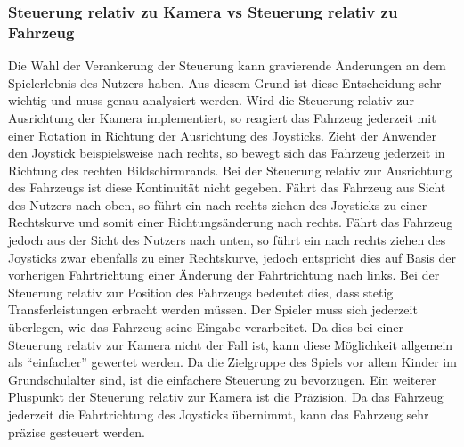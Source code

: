 	\subsubsection{Steuerung relativ zu Kamera vs Steuerung relativ zu Fahrzeug}
    Die Wahl der Verankerung der Steuerung kann gravierende Änderungen an dem Spielerlebnis des Nutzers haben. Aus diesem Grund ist diese Entscheidung sehr wichtig und muss genau analysiert werden.
    Wird die Steuerung relativ zur Ausrichtung der Kamera implementiert, so reagiert das Fahrzeug jederzeit mit einer Rotation in Richtung der Ausrichtung des Joysticks. Zieht der Anwender den Joystick beispielsweise nach rechts, so bewegt sich das Fahrzeug jederzeit in Richtung des rechten Bildschirmrands. Bei der Steuerung relativ zur Ausrichtung des Fahrzeugs ist diese Kontinuität nicht gegeben. Fährt das Fahrzeug aus Sicht des Nutzers nach oben, so führt ein nach rechts ziehen des Joysticks zu einer Rechtskurve und somit einer Richtungsänderung nach rechts.
    Fährt das Fahrzeug jedoch aus der Sicht des Nutzers nach unten, so führt ein nach rechts ziehen des Joysticks zwar ebenfalls zu einer Rechtskurve, jedoch entspricht dies auf Basis der vorherigen Fahrtrichtung einer Änderung der Fahrtrichtung nach links.
    Bei der Steuerung relativ zur Position des Fahrzeugs bedeutet dies, dass stetig Transferleistungen erbracht werden müssen. Der Spieler muss sich jederzeit überlegen, wie das Fahrzeug seine Eingabe verarbeitet. Da dies bei einer Steuerung relativ zur Kamera nicht der Fall ist, kann diese Möglichkeit allgemein als \enquote{einfacher} gewertet werden. Da die Zielgruppe des Spiels vor allem Kinder im Grundschulalter sind, ist die einfachere Steuerung zu bevorzugen. Ein weiterer Pluspunkt der Steuerung relativ zur Kamera ist die Präzision. Da das Fahrzeug jederzeit die Fahrtrichtung des Joysticks übernimmt, kann das Fahrzeug sehr präzise gesteuert werden.

